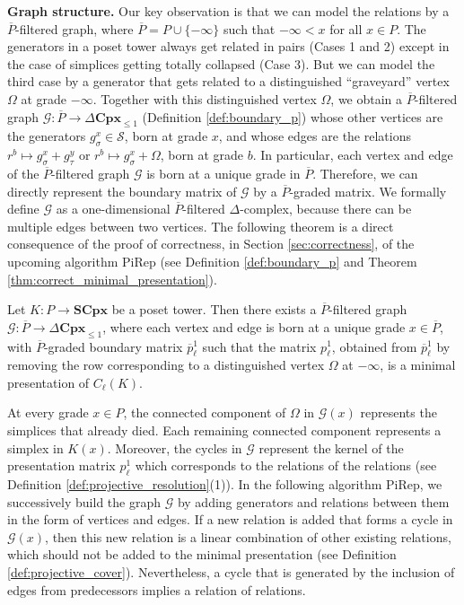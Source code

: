 \documentclass[english,a4paper,nolineno,cleveref]{socg-lipics-v2021}
\begin{document}
\textbf{Graph structure.} Our key observation is that we can model the relations by a $\overline{P}$-filtered graph, where $\overline{P}=P\cup\{-\infty\}$ such that $-\infty<x$ for all $x\in P$. 
The generators in a poset tower always get related in pairs (Cases 1 and 2) except in the case of simplices getting totally collapsed (Case 3). But we can model the third case by a generator that gets related to a distinguished ``graveyard'' vertex $\Omega$ at grade $-\infty$. Together with this distinguished vertex $\Omega$, we obtain a $\overline{P}$-filtered graph $\mathcal{G}\colon \overline{P}\rightarrow\Delta\mathbf{Cpx}_{\leq 1}$ (Definition \ref{def:boundary_p}) whose other vertices are the generators $g_\sigma^x\in\mathcal{S}$, born at grade $x$, and whose edges are the relations $r^b\mapsto g_\sigma^x+g_\tau^y$ or $r^b\mapsto g_\sigma^x+\Omega$, born at grade $b$. In particular, each vertex and edge of the $\overline{P}$-filtered graph $\mathcal{G}$ is born at a unique grade in $\overline{P}$. Therefore, we can directly represent the boundary matrix of $\mathcal{G}$ by a $\overline{P}$-graded matrix. We formally define $\mathcal{G}$ as a one-dimensional $\overline{P}$-filtered $\Delta$-complex, because there can be multiple edges between two vertices. The following theorem is a direct consequence of the proof of correctness, in Section \ref{sec:correctness}, of the upcoming algorithm {\sc PiRep} (see Definition \ref{def:boundary_p} and Theorem \ref{thm:correct_minimal_presentation}).

\begin{theorem} \label{thm:graph_presentation_matrix}
Let $K\colon P\rightarrow \mathbf{SCpx}$ be a poset tower. Then there exists a $\overline{P}$-filtered graph $\mathcal{G}\colon \overline{P}\rightarrow\Delta\mathbf{Cpx}_{\leq 1}$, where each vertex and edge is born at a unique grade $x\in\overline{P}$, with $\overline{P}$-graded boundary matrix $\overline{p}^1_\ell$ such that the matrix $p^1_\ell$, obtained from $\overline{p}^1_\ell$ by removing the row corresponding to a distinguished vertex $\Omega$ at $-\infty$, is a minimal presentation of $C_\ell(K)$.
\end{theorem}

At every grade $x\in P$, the connected component of $\Omega$ in $\mathcal{G}(x)$ represents the simplices that already died. Each remaining connected component represents a simplex in $K(x)$. Moreover, the cycles in $\mathcal{G}$ represent the kernel of the presentation matrix $p^1_\ell$ which corresponds to the relations of the relations (see Definition \ref{def:projective_resolution}(1)). In the following algorithm {\sc PiRep}, we successively build the graph $\mathcal{G}$ by adding generators and relations between them in the form of vertices and edges. If a new relation is added that forms a cycle in $\mathcal{G}(x)$, then this new relation is a linear combination of other existing relations, which should not be added to the minimal presentation (see Definition \ref{def:projective_cover}). Nevertheless, a cycle that is generated by the inclusion of edges from predecessors implies a relation of relations.    
\end{document}
